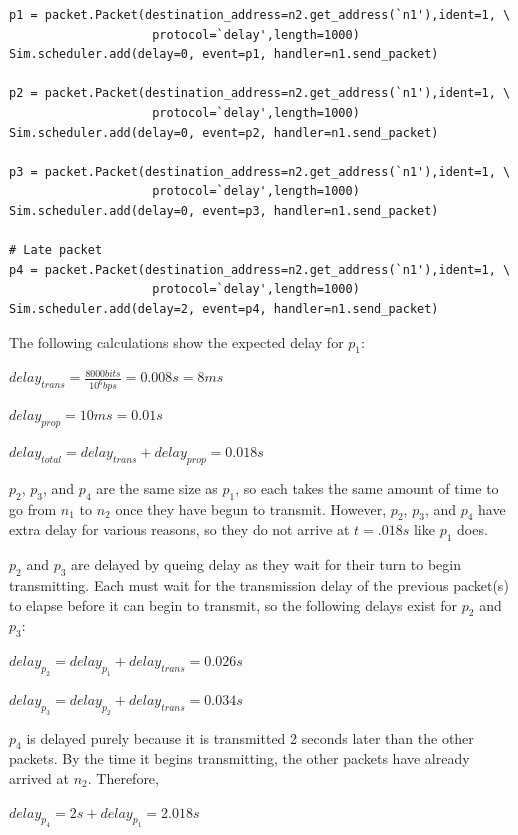 \documentclass[11pt]{article}
\begin{document}
\begin{description}
\begin{lstlisting}[caption={Network 1.3},label=sec1exp3]
p1 = packet.Packet(destination_address=n2.get_address(`n1'),ident=1, \
                    protocol=`delay',length=1000)
Sim.scheduler.add(delay=0, event=p1, handler=n1.send_packet)

p2 = packet.Packet(destination_address=n2.get_address(`n1'),ident=1, \
                    protocol=`delay',length=1000)
Sim.scheduler.add(delay=0, event=p2, handler=n1.send_packet)

p3 = packet.Packet(destination_address=n2.get_address(`n1'),ident=1, \
                    protocol=`delay',length=1000)
Sim.scheduler.add(delay=0, event=p3, handler=n1.send_packet)

# Late packet
p4 = packet.Packet(destination_address=n2.get_address(`n1'),ident=1, \
                    protocol=`delay',length=1000)
Sim.scheduler.add(delay=2, event=p4, handler=n1.send_packet)
\end{lstlisting}

The following calculations show the expected delay for $p_1$:
\begin{addmargin}[1em]{0em}
$delay_{trans} = \frac{8000 bits}{10^{6}bps} = 0.008s = 8ms$

$delay_{prop} = 10ms = 0.01s$

$delay_{total} = delay_{trans} + delay_{prop} = 0.018s $
\end{addmargin}

$p_2$, $p_3$, and $p_4$ are the same size as $p_1$, so each takes the same amount of time to go from $n_1$ to $n_2$ once they have begun to transmit. However, $p_2$, $p_3$, and $p_4$ have extra delay for various reasons, so they do not arrive at $t = .018s$ like $p_1$ does.

$p_2$ and $p_3$ are delayed by queing delay as they wait for their turn to begin transmitting. Each must wait for the transmission delay of the previous packet(s) to elapse before it can begin to transmit, so the following delays exist for $p_2$ and $p_3$:
\begin{addmargin}[1em]{0em}
$delay_{p_{2}} = delay_{p_{1}} + delay_{trans} = 0.026s$

$delay_{p_{3}} = delay_{p_{2}} + delay_{trans} = 0.034s$
\end{addmargin}

$p_4$ is delayed purely because it is transmitted 2 seconds later than the other packets. By the time it begins transmitting, the other packets have already arrived at $n_2$. Therefore,
\begin{addmargin}[1em]{0em}
$delay_{p_{4}} = 2s + delay_{p_{1}} = 2.018s$
\end{addmargin}


\end{description}
\end{document}
